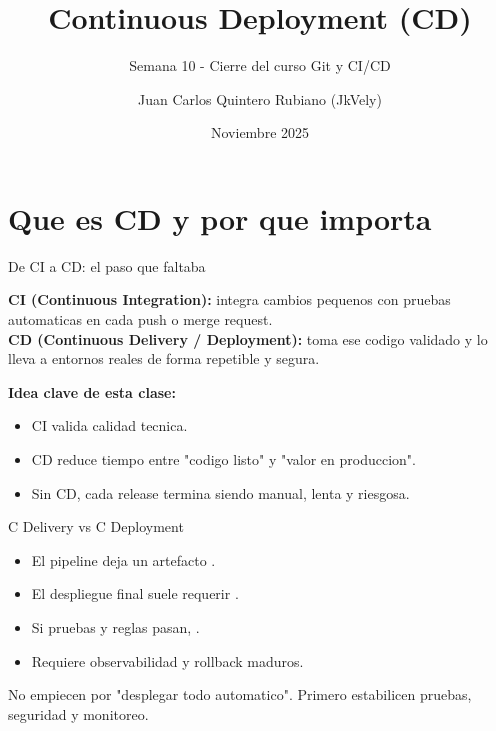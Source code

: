 \documentclass[aspectratio=169]{beamer}
\title{Continuous Deployment (CD)}
\subtitle{Semana 10 - Cierre del curso Git y CI/CD}
\author{Juan Carlos Quintero Rubiano (JkVely)}
\date{Noviembre 2025}
\begin{document}

\contentsframe

\section{Que es CD y por que importa}

\begin{frame}{De CI a CD: el paso que faltaba}
	\begin{orangebox}
		\textbf{CI (Continuous Integration):} integra cambios pequenos con pruebas automaticas en cada push o merge request.\\
		\textbf{CD (Continuous Delivery / Deployment):} toma ese codigo validado y lo lleva a entornos reales de forma repetible y segura.
	\end{orangebox}

	\vspace{0.35cm}
	\textbf{Idea clave de esta clase:}
	\begin{itemize}
		\item CI valida calidad tecnica.
		\item CD reduce tiempo entre "codigo listo" y "valor en produccion".
		\item Sin CD, cada release termina siendo manual, lenta y riesgosa.
	\end{itemize}
\end{frame}

\begin{frame}{C Delivery vs C Deployment}
	\begin{comparebox}
		\begin{darkbox}
			\begin{itemize}
				\item El pipeline deja un artefacto .
				\item El despliegue final suele requerir .
			\end{itemize}
		\end{darkbox}
	\comparebreak
		\begin{darkbox}
			\begin{itemize}
				\item Si pruebas y reglas pasan, .
				\item Requiere observabilidad y rollback maduros.
			\end{itemize}
		\end{darkbox}
	\end{comparebox}

	\begin{alertbox}
		No empiecen por "desplegar todo automatico". Primero estabilicen pruebas, seguridad y monitoreo.
	\end{alertbox}
\end{frame}
\end{document}
